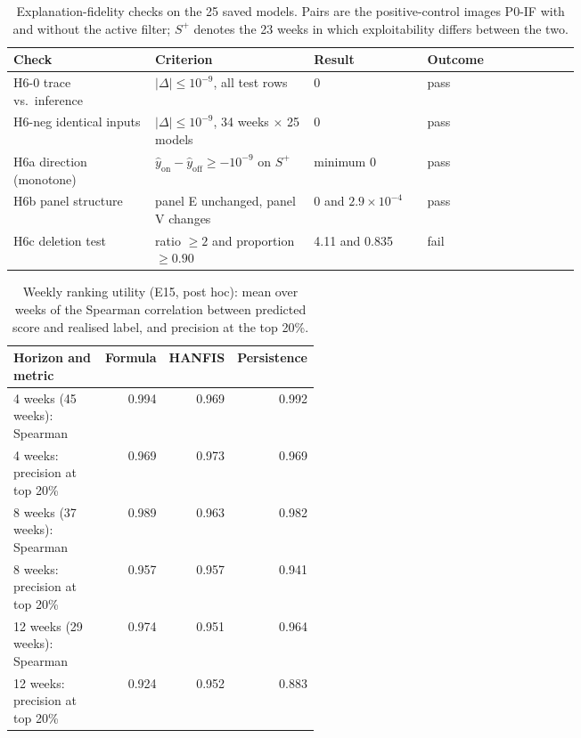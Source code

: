 \documentclass[pdflatex,sn-basic]{sn-jnl}
\theoremstyle{thmstyleone}%
\theoremstyle{thmstyletwo}%
\theoremstyle{thmstylethree}%
\begin{document}
\begin{table}[ht]
\caption{Explanation-fidelity checks on the 25 saved models. Pairs are the positive-control images P0-IF with and without the active filter; $S^{+}$ denotes the 23 weeks in which exploitability differs between the two.}\label{tab:e6}
\begin{tabular}{@{}p{0.25\linewidth}p{0.29\linewidth}p{0.20\linewidth}l@{}}
\hline
Check & Criterion & Result & Outcome\\
\hline
H6-0 trace vs.\ inference & $|\Delta|\le10^{-9}$, all test rows & 0 & pass\\
H6-neg identical inputs & $|\Delta|\le10^{-9}$, 34 weeks $\times$ 25 models & 0 & pass\\
H6a direction (monotone) & $\hat y_{\mathrm{on}}-\hat y_{\mathrm{off}}\ge-10^{-9}$ on $S^{+}$ & minimum 0 & pass\\
H6b panel structure & panel E unchanged, panel V changes & $0$ and $2.9\times10^{-4}$ & pass\\
H6c deletion test & ratio $\ge2$ and proportion $\ge0.90$ & 4.11 and 0.835 & fail\\
\hline
\end{tabular}
\end{table}

\begin{table}[ht]
\caption{Weekly ranking utility (E15, post hoc): mean over weeks of the Spearman correlation between predicted score and realised label, and precision at the top 20\%.}\label{tab:e15}
\small
\begin{tabular}{@{}p{0.40\linewidth}rrr@{}}
\hline
Horizon and metric & Formula & HANFIS & Persistence\\
\hline
4 weeks (45 weeks): Spearman & 0.994 & 0.969 & 0.992\\
4 weeks: precision at top 20\% & 0.969 & 0.973 & 0.969\\
8 weeks (37 weeks): Spearman & 0.989 & 0.963 & 0.982\\
8 weeks: precision at top 20\% & 0.957 & 0.957 & 0.941\\
12 weeks (29 weeks): Spearman & 0.974 & 0.951 & 0.964\\
12 weeks: precision at top 20\% & 0.924 & 0.952 & 0.883\\
\hline
\end{tabular}
\end{table}
\end{document}
